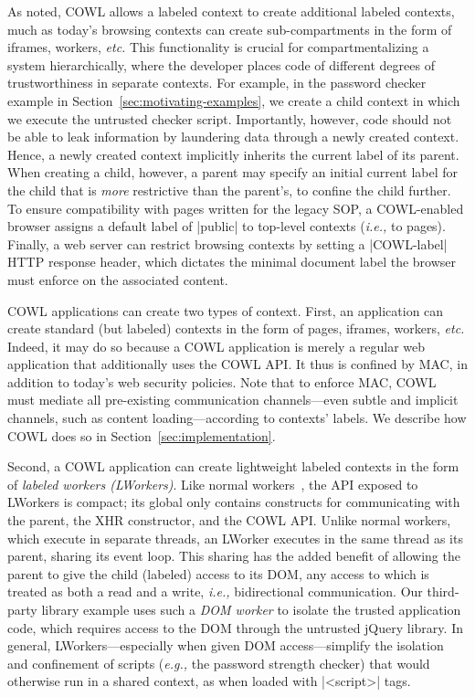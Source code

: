 As noted, COWL allows a labeled context to create additional labeled contexts,
much as today's browsing contexts can create sub-compartments
in the form of iframes, workers, \emph{etc.}
%
This functionality is crucial for compartmentalizing a system
hierarchically, where the developer places code of different degrees
of trustworthiness in separate contexts.
%
For example, in the password checker example in
Section~\ref{sec:motivating-examples}, we create a child context in
which we execute the untrusted checker script.
%
Importantly, however, code should not be able to leak information by
laundering data through a newly created context.
%
Hence, a newly created context implicitly inherits the current label of
its parent.
%
When creating a child, however, a parent may specify an initial
current label for the child that is {\em more} restrictive than the
parent's, to confine the child further.
%
To ensure compatibility with pages written for the legacy SOP, a
COWL-enabled browser assigns a default label of \js|public| to top-level
contexts (\emph{i.e.,} to pages).
%
Finally, a web server can restrict browsing contexts by setting a
\js|COWL-label| HTTP response header, which dictates the minimal
document label the browser must enforce on the associated content.

COWL applications can create two types of context.
%
First, an application can create standard (but labeled) contexts in
the form of pages, iframes, workers, \emph{etc.}
%
Indeed, it may do so because a COWL application is merely a regular
web application that additionally uses the COWL API. It thus is
confined by MAC, in addition to today's web security policies.
%
Note that to enforce MAC, COWL must mediate all pre-existing
communication channels---even subtle and implicit channels, such as
content loading---according to contexts' labels.
%
We describe how COWL does so in Section~\ref{sec:implementation}.

Second, a COWL application can create lightweight labeled contexts in
the form of \emph{labeled workers (LWorkers)}.
%
Like normal workers~\cite{workers}, the API exposed to LWorkers is
compact; its global only contains constructs for communicating with
the parent, the XHR constructor, and the COWL API.
%
Unlike normal workers, which execute in separate threads, an LWorker
executes in the same thread as its parent, sharing its event loop.
%
This sharing has the added benefit of allowing the parent to give the
child (labeled) access to its DOM, any access to which is treated as
both a read and a write, \emph{i.e.,} bidirectional communication.
%
Our third-party library example uses such a \emph{DOM worker} to
isolate the trusted application code, which requires access to the DOM
through the untrusted jQuery library.
%
In general, LWorkers---especially when given DOM access---simplify the
isolation and confinement of scripts (\emph{e.g.,} the password strength
checker) that would otherwise run in a shared context, as when loaded
with \js|<script>| tags.


